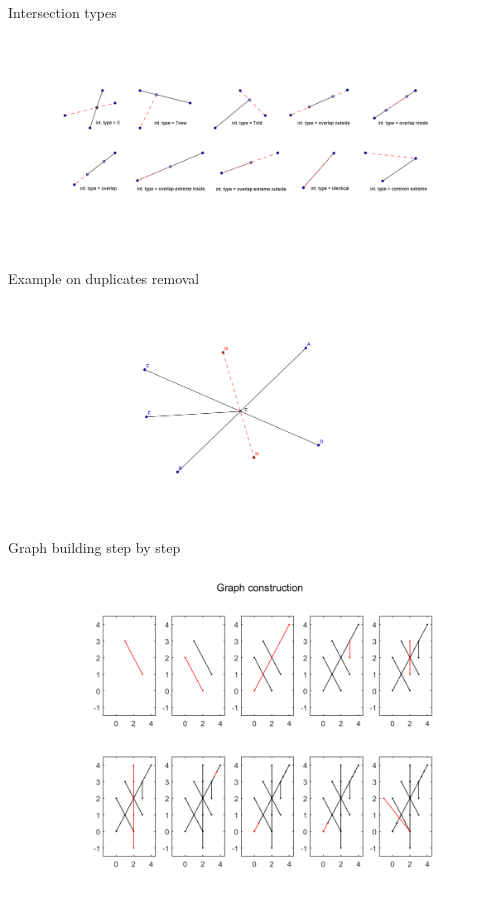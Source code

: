 \documentclass[11pt]{beamer}
\begin{document}
	\begin{frame}{Intersection types}
		\begin{figure}
		\centering 
		\includegraphics[width=1\textwidth]{"int_type"}
		\end{figure}
	\end{frame}

	\begin{frame}{Example on duplicates removal}
		\begin{figure}
			\centering 
			\includegraphics[width=1\textwidth]{"rem_dupl"}
		\end{figure}
	\end{frame}

	\begin{frame}{Graph building step by step}
		\begin{figure}
			\centering 
			\includegraphics[width=.9\textwidth]{"graph_building_process"}
		\end{figure}
	\end{frame}
\end{document}
